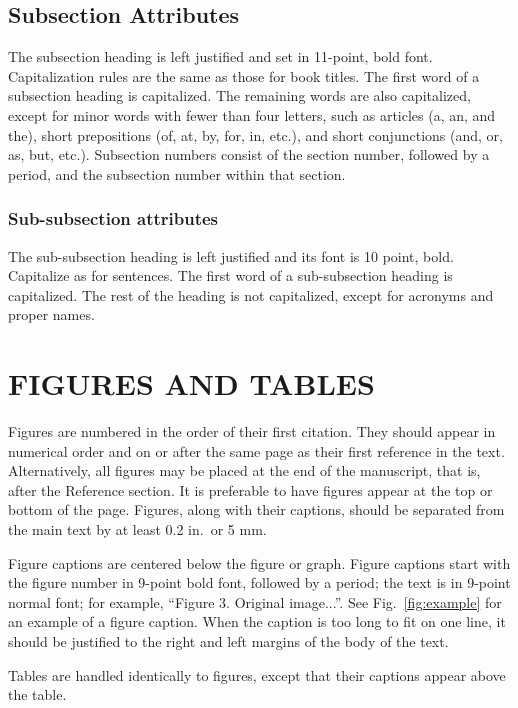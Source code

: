 \documentclass[]{spie}  %
\begin{document}
\subsection{Subsection Attributes}

The subsection heading is left justified and set in 11-point, bold font.  Capitalization rules are the same as those for book titles.  The first word of a subsection heading is capitalized.  The remaining words are also capitalized, except for minor words with fewer than four letters, such as articles (a, an, and the), short prepositions (of, at, by, for, in, etc.), and short conjunctions (and, or, as, but, etc.).  Subsection numbers consist of the section number, followed by a period, and the subsection number within that section.  

\subsubsection{Sub-subsection attributes}
The sub-subsection heading is left justified and its font is 10 point, bold.  Capitalize as for sentences.  The first word of a sub-subsection heading is capitalized.  The rest of the heading is not capitalized, except for acronyms and proper names.  

\section{FIGURES AND TABLES}

Figures are numbered in the order of their first citation.  They should appear in numerical order and on or after the same page as their first reference in the text.  Alternatively, all figures may be placed at the end of the manuscript, that is, after the Reference section.  It is preferable to have figures appear at the top or bottom of the page.  Figures, along with their captions, should be separated from the main text by at least 0.2 in.\ or 5 mm.  

Figure captions are centered below the figure or graph.  Figure captions start with the figure number in 9-point bold font, followed by a period; the text is in 9-point normal font; for example, ``{\footnotesize{Figure 3.}  Original image...}''.  See Fig.~\ref{fig:example} for an example of a figure caption.  When the caption is too long to fit on one line, it should be justified to the right and left margins of the body of the text.  

Tables are handled identically to figures, except that their captions appear above the table. 
\end{document}
